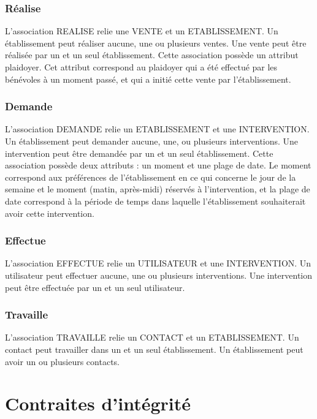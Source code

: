 \documentclass[asi, sansVersion]{picINSA}
\begin{document}
\subsection*{Réalise}

L'association REALISE relie une VENTE et un ETABLISSEMENT. Un établissement peut réaliser aucune, une ou plusieurs ventes. Une vente peut être réalisée par un et un seul établissement. Cette association possède un attribut plaidoyer. Cet attribut correspond au plaidoyer qui a été effectué par les bénévoles à un moment passé, et qui a initié cette vente par l'établissement. 


\subsection*{Demande}

L'association DEMANDE relie un ETABLISSEMENT et une INTERVENTION. Un établissement peut demander aucune, une, ou plusieurs interventions. Une intervention peut être demandée par un et un seul établissement. Cette association possède deux attributs : un moment et une plage de date. Le moment correspond aux préférences de l'établissement en ce qui concerne le jour de la semaine et le moment (matin, après-midi) réservés à l'intervention, et la plage de date correspond à la période de temps dans laquelle l'établissement souhaiterait avoir cette intervention. 


\subsection*{Effectue} 

L'association EFFECTUE relie un UTILISATEUR et une INTERVENTION. Un utilisateur peut effectuer aucune, une ou plusieurs interventions. Une intervention peut être effectuée par un et un seul utilisateur. 

\subsection*{Travaille}

L'association TRAVAILLE relie un CONTACT et un ETABLISSEMENT. Un contact peut travailler dans un et un seul établissement. Un établissement peut avoir un ou plusieurs contacts.   

\chapter{Contraites d'intégrité}
\end{document}
